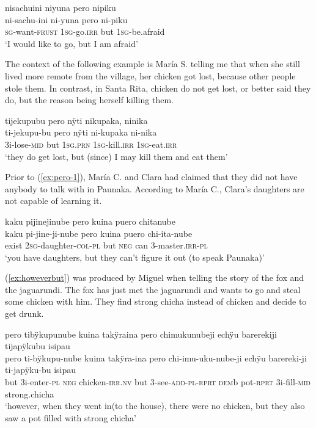 \ea\label{ex:pero-2}
\begingl
\glpreamble nisachuini niyuna pero nipiku\\
\gla ni-sachu-ini ni-yuna pero ni-piku\\
\textsc{sg}-want-\textsc{frust} 1\textsc{sg}-go.\textsc{irr} but 1\textsc{sg}-be.afraid\\
\glft ‘I would like to go, but I am afraid’
\endgl
\trailingcitation{[jxx-p110923l-1.403]}
\xe

The context of the following example is María S. telling me that when she still lived more remote from the village, her chicken got lost, because other people stole them. In contrast, in Santa Rita, chicken do not get lost, or better said they do, but the reason being herself killing them.

\ea\label{ex:pero-chicken}
\begingl
\glpreamble tijekupubu pero nÿti nikupaka, ninika\\
\gla ti-jekupu-bu pero nÿti ni-kupaka ni-nika\\
\glb 3i-lose-\textsc{mid} but 1\textsc{sg.prn} 1\textsc{sg}-kill.\textsc{irr} 1\textsc{sg}-eat.\textsc{irr}\\
\glft ‘they do get lost, but (since) I may kill them and eat them’
\endgl
\trailingcitation{[rxx-e120511l.184-185]}
\xe


Prior to (\ref{ex:pero-1}), María C. and Clara had claimed that they did not have anybody to talk with in Paunaka. According to María C., Clara’s daughters are not capable of learning it.

\ea\label{ex:pero-1}
\begingl
\glpreamble kaku pijinejinube pero kuina puero chitanube \\
\gla kaku pi-jine-ji-nube pero kuina puero chi-ita-nube \\
\glb exist 2\textsc{sg}-daughter-\textsc{col}-\textsc{pl} but \textsc{neg} can 3-master.\textsc{irr}-\textsc{pl}\\
\glft ‘you have daughters, but they can’t figure it out (to speak Paunaka)’
\endgl
\trailingcitation{[cux-c120414ls-2.265]}
\xe

(\ref{ex:howeverbut}) was produced by Miguel when telling the story of the fox and the jagua\-run\-di. The fox has just met the jaguarundi and wants to go and steal some chicken with him. They find strong chicha instead of chicken and decide to get drunk.

\ea\label{ex:howeverbut}
\begingl
\glpreamble pero tibÿkupunube kuina takÿraina pero chimukunubeji echÿu barerekiji tijapÿkubu isipau\\
\gla pero ti-bÿkupu-nube kuina takÿra-ina pero chi-imu-uku-nube-ji echÿu barereki-ji ti-japÿku-bu isipau\\
\glb but 3i-enter-\textsc{pl} \textsc{neg} chicken-\textsc{irr.nv} but 3-see-\textsc{add}-\textsc{pl}-\textsc{rprt} \textsc{dem}b pot-\textsc{rprt} 3i-fill-\textsc{mid} strong.chicha\\
\glft ‘however, when they went in(to the house), there were no chicken, but they also saw a pot filled with strong chicha’
\endgl
\trailingcitation{[jmx-n120429ls-x5.325-328]}
\xe

